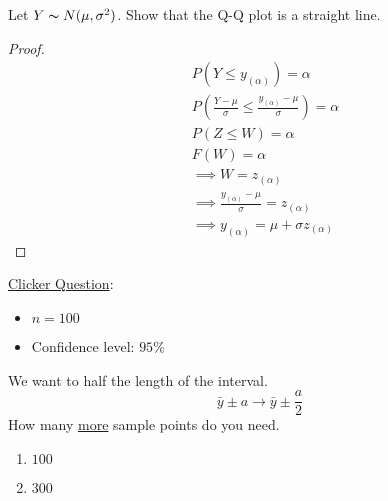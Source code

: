 Let $ Y \thicksim N(\mu,\sigma^2) $. Show that the Q-Q plot is a straight line.
\begin{proof}
    \begin{align*}
         & P(Y\leqslant y_{(\alpha)})=\alpha                                                      \\
         & P\left( \frac{Y-\mu}{\sigma} \leqslant \frac{y_{(\alpha)}-\mu}{\sigma}  \right)=\alpha \\
         & P(Z\leqslant W)=\alpha                                                                 \\
         & F(W)=\alpha                                                                            \\
         & \implies W=z_{(\alpha)}                                                                \\
         & \implies \frac{y_{(\alpha)}-\mu}{\sigma}=z_{(\alpha)}                                  \\
         & \implies y_{(\alpha)}=\mu+\sigma z_{(\alpha)}
    \end{align*}
\end{proof}

\underline{Clicker Question}:
\begin{itemize}
    \item $ n=100 $
    \item Confidence level: $ 95\% $
\end{itemize}
We want to half the length of the interval.
\[ \bar{y}\pm a\rightarrow \bar{y}\pm \frac{a}{2} \] How many
\underline{more} sample points do you need.
\begin{enumerate}[label=(\alph*)]
    \item $ 100 $
    \item $ 300 $
\end{enumerate}
